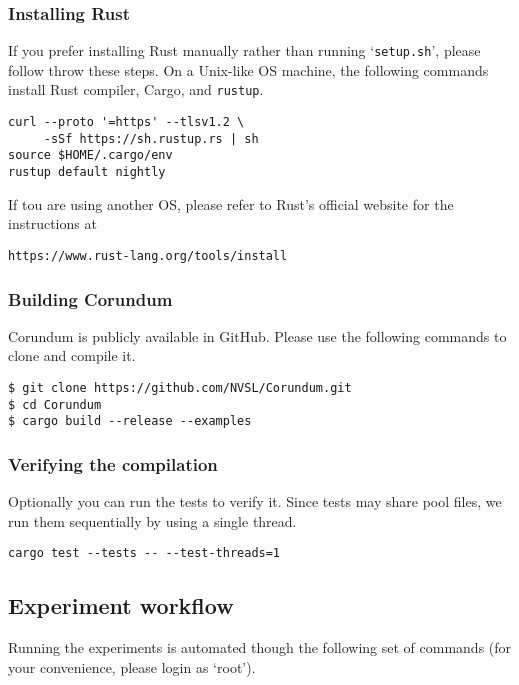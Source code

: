 {\subsubsection{Installing Rust}

If you prefer installing Rust manually rather than running `\verb+setup.sh+', please follow throw these steps.
On a Unix-like OS machine, the following commands
install Rust compiler, Cargo, and \verb+rustup+. 

\begin{verbatim}
curl --proto '=https' --tlsv1.2 \
     -sSf https://sh.rustup.rs | sh
source $HOME/.cargo/env
rustup default nightly
\end{verbatim}

If tou are using
another OS, please refer to Rust's official website
for the instructions at
\begin{center}
  \verb+https://www.rust-lang.org/tools/install+
\end{center}

\subsubsection{Building Corundum}

Corundum is publicly available in GitHub. Please use
the following commands to clone and compile it.

\begin{verbatim}
$ git clone https://github.com/NVSL/Corundum.git
$ cd Corundum
$ cargo build --release --examples
\end{verbatim}

\subsubsection{Verifying the compilation}

Optionally you can run the tests to verify it.
Since tests may share pool files, we run them sequentially
by using a single thread.

\begin{verbatim}
cargo test --tests -- --test-threads=1 
\end{verbatim}

\subsection{Experiment workflow}

Running the experiments is automated though the following set of commands (for your convenience, please login as `root').

}
